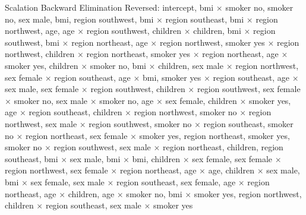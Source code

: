 \documentclass{article}
\begin{document}
Scalation Backward Elimination Reversed: intercept, bmi $\times$ smoker no, smoker no, sex male, bmi, region southwest, bmi $\times$ region southeast, bmi $\times$ region northwest, age, age $\times$ region southwest, children $\times$ children, bmi $\times$ region southwest, bmi $\times$ region northeast, age $\times$ region northwest, smoker yes $\times$ region northwest, children $\times$ region northeast, smoker yes $\times$ region northeast, age $\times$ smoker yes, children $\times$ smoker no, bmi $\times$ children, sex male $\times$ region northwest, sex female $\times$ region southeast, age $\times$ bmi, smoker yes $\times$ region southeast, age $\times$ sex male, sex female $\times$ region southwest, children $\times$ region southwest, sex female $\times$ smoker no, sex male $\times$ smoker no, age $\times$ sex female, children $\times$ smoker yes, age $\times$ region southeast, children $\times$ region northwest, smoker no $\times$ region northwest, sex male $\times$ region southwest, smoker no $\times$ region southeast, smoker no $\times$ region northeast, sex female $\times$ smoker yes, region northeast, smoker yes, smoker no $\times$ region southwest, sex male $\times$ region northeast, children, region southeast, bmi $\times$ sex male, bmi $\times$ bmi, children $\times$ sex female, sex female $\times$ region northwest, sex female $\times$ region northeast, age $\times$ age, children $\times$ sex male, bmi $\times$ sex female, sex male $\times$ region southeast, sex female, age $\times$ region northeast, age $\times$ children, age $\times$ smoker no, bmi $\times$ smoker yes, region northwest, children $\times$ region southeast, sex male $\times$ smoker yes
\end{document}
